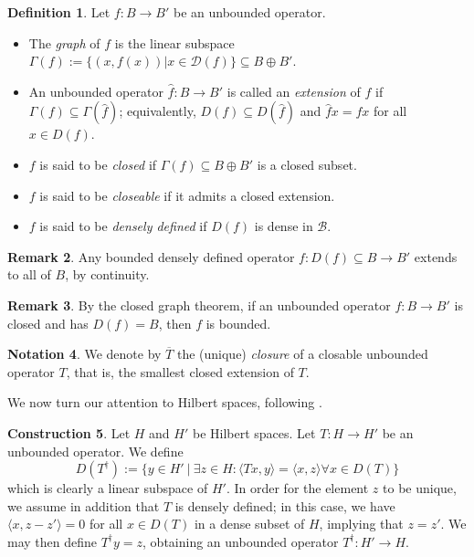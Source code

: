 \documentclass{article}
\newcommand{\B}{\mathcal{B}}
\newcommand{\D}{\mathcal{D}}
\numberwithin{equation}{section}
\theoremstyle{definition}
\newtheorem{definition}{Definition}[subsection]
\newtheorem{construction}[definition]{Construction}
\newtheorem{remark}[definition]{Remark}
\newtheorem{notation}[definition]{Notation}
\theoremstyle{theorem}
\begin{document}
\begin{definition}
    Let $f \colon B \to B'$ be an unbounded operator.
    \begin{itemize}
        \item The \emph{graph} of $f$ is the linear subspace $\Gamma(f) := \{(x,f(x)) | x \in \D(f)\} \subseteq B \oplus B'$.
        \item An unbounded operator $\hat{f} \colon B \to B'$ is called an \emph{extension} of $f$ if $\Gamma(f) \subseteq \Gamma(\hat{f})$; equivalently, 
                $D(f) \subseteq D(\hat{f})$ and $\hat{f}x = fx$ for all $x \in D(f)$.
        \item $f$ is said to be \emph{closed} if $\Gamma(f) \subseteq B \oplus B'$ is a closed subset. 
        \item $f$ is said to be \emph{closeable} if it admits a closed extension.
        \item $f$ is said to be \emph{densely defined} if $D(f)$ is dense in $\B$. 
    \end{itemize}
\end{definition}
\begin{remark}
    Any bounded densely defined operator $f \colon D(f) \subseteq B \to B'$ extends to all of $B$, by continuity.%
\end{remark}
\begin{remark}
    By the closed graph theorem, if an unbounded operator $f \colon B \to B'$ is closed and has $D(f) = B$, then $f$ is bounded. 
\end{remark}
\begin{notation}
    We denote by $\overline{T}$ the (unique) \emph{closure} of a closable unbounded operator $T$, that is, the smallest closed 
    extension of $T$.
\end{notation}
We now turn our attention to Hilbert spaces, following \cite[Section 1.2]{Schmuedgen2012unbounded}.
\begin{construction}\label{Construction: adjoint of a densely defined unbounded operator}
    Let $H$ and $H'$ be Hilbert spaces. Let $T \colon H \to H'$ be an unbounded operator. We define 
    \begin{equation}
        D(T^\dagger) := \{y \in H' \ | \ \exists z \in H : \langle Tx,y \rangle = \langle x , z \rangle \forall x \in D(T) \}
    \end{equation}%
    which is clearly a linear subspace of $H'$. In order for the element $z$ to be unique, we assume in addition that $T$ is densely defined; 
    in this case, we have $\langle x, z - z' \rangle = 0$ for all $x \in D(T)$ in a dense subset of $H$, implying that $z = z'$. We may then define 
    $T^\dagger y = z$, obtaining an unbounded operator $T^\dagger \colon H' \to H$.
\end{construction}
\end{document}
